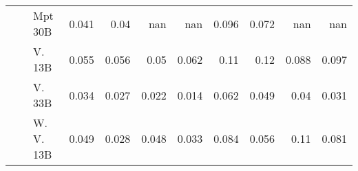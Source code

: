 \begin{table}[!htbp]
\begin{tabular}{l|l|l|rrrr|rrrr}
  &  & Mpt 30B   & {\cellcolor[HTML]{D4E4F4}} \color[HTML]{000000} 0.041 & {\cellcolor[HTML]{D6E5F4}} \color[HTML]{000000} 0.04 & {\cellcolor[HTML]{000000}} \color[HTML]{F1F1F1} nan & {\cellcolor[HTML]{000000}} \color[HTML]{F1F1F1} nan & {\cellcolor[HTML]{FCBBA1}} \color[HTML]{000000} 0.096 & {\cellcolor[HTML]{FDD5C4}} \color[HTML]{000000} 0.072 & {\cellcolor[HTML]{000000}} \color[HTML]{F1F1F1} nan & {\cellcolor[HTML]{000000}} \color[HTML]{F1F1F1} nan \\
  &  & V. 13B  & {\cellcolor[HTML]{C1D9ED}} \color[HTML]{000000} 0.055 & {\cellcolor[HTML]{BDD7EC}} \color[HTML]{000000} 0.056 & {\cellcolor[HTML]{C9DDF0}} \color[HTML]{000000} 0.05 & {\cellcolor[HTML]{B0D2E7}} \color[HTML]{000000} 0.062 & {\cellcolor[HTML]{FCAA8D}} \color[HTML]{000000} 0.11 & {\cellcolor[HTML]{FCA183}} \color[HTML]{000000} 0.12 & {\cellcolor[HTML]{FCC4AD}} \color[HTML]{000000} 0.088 & {\cellcolor[HTML]{FCB99F}} \color[HTML]{000000} 0.097 \\
  &  & V. 33B  & {\cellcolor[HTML]{DDEAF7}} \color[HTML]{000000} 0.034 & {\cellcolor[HTML]{E7F0FA}} \color[HTML]{000000} 0.027 & {\cellcolor[HTML]{EEF5FC}} \color[HTML]{000000} 0.022 & {\cellcolor[HTML]{F7FBFF}} \color[HTML]{000000} 0.014 & {\cellcolor[HTML]{FEE1D4}} \color[HTML]{000000} 0.062 & {\cellcolor[HTML]{FEE9DF}} \color[HTML]{000000} 0.049 & {\cellcolor[HTML]{FFF0E8}} \color[HTML]{000000} 0.04 & {\cellcolor[HTML]{FFF5F0}} \color[HTML]{000000} 0.031 \\
  &  & W. V. 13B  & {\cellcolor[HTML]{CADEF0}} \color[HTML]{000000} 0.049 & {\cellcolor[HTML]{E6F0F9}} \color[HTML]{000000} 0.028 & {\cellcolor[HTML]{CCDFF1}} \color[HTML]{000000} 0.048 & {\cellcolor[HTML]{DFEBF7}} \color[HTML]{000000} 0.033 & {\cellcolor[HTML]{FDC9B3}} \color[HTML]{000000} 0.084 & {\cellcolor[HTML]{FEE5D8}} \color[HTML]{000000} 0.056 & {\cellcolor[HTML]{FCAA8D}} \color[HTML]{000000} 0.11 & {\cellcolor[HTML]{FDCBB6}} \color[HTML]{000000} 0.081 \\

\bottomrule

\end{tabular}
\setlength{\tabcolsep}{6pt}
\end{table}
